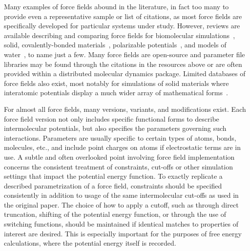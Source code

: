 \documentclass[9pt,bestpractices]{livecoms}
\begin{document}
Many examples of force fields abound in the literature, in fact too many to provide even a representative sample or list of citations, as most force fields are specifically developed for particular systems under study.
However, reviews are available describing and comparing force fields for biomolecular simulations~\citep{Ponder2003, Riniker2018}, solid, covalently-bonded materials~\citep{Mishra2017}, polarizable potentials~\citep{Lopes2009}, and models of water~\citep{Onufriev2018, Vega2011}, to name just a few. 
Many force fields are open-source and parameter file libraries may be found through the citations in the resources above or are often provided within a distributed molecular dynamics package. 
Limited databases of force fields also exist, most notably for simulations of solid materials where interatomic potentials display a much wider array of mathematical forms~\citep{openKIM, IPRnist}.

For almost all force fields, many versions, variants, and modifications exist.
Each force field version not only includes specific functional forms to describe intermolecular potentials, but also specifies the parameters governing such interactions.
Parameters are usually specific to certain types of atoms, bonds, molecules, etc., and include point charges on atoms if electrostatic terms are in use. 
A subtle and often overlooked point involving force field implementation concerns the consistent treatment of constraints, cut-offs or other simulation settings that impact the potential energy function.
To exactly replicate a described parametrization of a force field, constraints should be specified consistently in addition to usage of the same intermolecular cut-offs as used in the original paper.
The choice of how to apply a cutoff, such as through direct truncation, shifting of the potential energy function, or through the use of switching functions, should be maintained if identical matches to properties of interest are desired.
This is especially important for the purposes of free energy calculations, where the potential energy itself is recorded.
\end{document}
